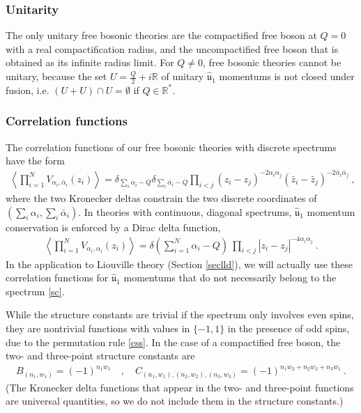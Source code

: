 \documentclass[12pt, a4paper, notitlepage, twoside]{report}
\numberwithin{equation}{section}
\theoremstyle{break}
\begin{document}
\subsubsection{Unitarity}

The only unitary free bosonic theories are the compactified free boson at $Q=0$ with a real compactification radius, and the uncompactified free boson that is obtained as its infinite radius limit. For $Q\neq 0$, free bosonic theories cannot be unitary, because the set $U=\frac{Q}{2}+i\mathbb{R}$ of unitary $\hat{\mathfrak{u}}_1$ momentums is not closed under fusion, i.e. $(U+U)\cap U = \emptyset$ if $Q\in \mathbb{R}^*$.

\subsubsection{Correlation functions}

The correlation functions of our free bosonic theories with discrete spectrums have the form
\begin{align}
 \left\langle \prod_{i=1}^N V_{\alpha_i,\bar\alpha_i}(z_i) \right\rangle = 
 \delta_{\sum_i \alpha_i-Q} \delta_{\sum_i\bar\alpha_i-Q} 
 \prod_{i<j} (z_i-z_j)^{-2\alpha_i\alpha_j}(\bar{z}_i-\bar{z}_j)^{-2\bar{\alpha}_i\bar{\alpha}_j}\ , 
\end{align}
where the two Kronecker deltas constrain the two discrete coordinates of $(\sum_i\alpha_i,\sum_i\bar\alpha_i)$.
In theories with continuous, diagonal spectrums, $\hat{\mathfrak{u}}_1$ momentum conservation is enforced by a Dirac delta function,
\begin{align}
 \left\langle \prod_{i=1}^N V_{\alpha_i,\alpha_i}(z_i)\right\rangle = \delta\left({\textstyle \sum}_{i=1}^N\alpha_i-Q\right)\ \prod_{i<j} |z_i-z_j|^{-4\alpha_i\alpha_j} \ .
\label{dpzz}
\end{align}
In the application to Liouville theory (Section \ref{seclld}), we will actually use these correlation functions for $\hat{\mathfrak{u}}_1$ momentums that do not necessarily belong to the spectrum \eqref{sc}. 

While the structure constants are trivial if the spectrum only involves even spins, they are nontrivial functions with values in $\{-1,1\}$ in the presence of odd spins, due to the permutation rule \eqref{css}. In the case of a compactified free boson, the two- and three-point structure constants are 
\begin{align}
B_{(n_1,w_1)} = (-1)^{n_1w_1} \quad , \quad 
 C_{(n_1,w_1),(n_2,w_2),(n_3,w_3)} = (-1)^{n_1w_2 + n_2w_3+n_3w_1}\ .
 \label{csigns}
\end{align}
(The Kronecker delta functions that appear in the two- and three-point functions are universal quantities, so we do not include them in the structure constants.)
\end{document}

